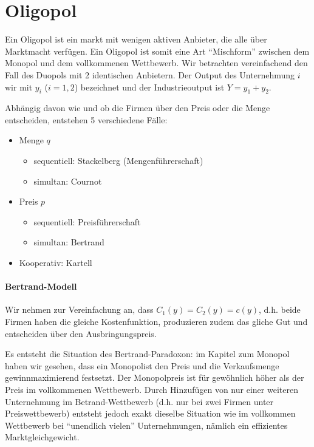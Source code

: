\chapter{Oligopol}

Ein Oligopol ist ein markt mit wenigen aktiven Anbieter, die alle über Marktmacht verfügen. Ein Oligopol ist somit eine Art \enquote{Mischform} zwischen dem Monopol und dem vollkommenen Wettbewerb. Wir betrachten vereinfachend den Fall des Duopols mit 2 identischen Anbietern. Der Output des Unternehmung $i$ wir mit $y_i$ ($i=1,2$) bezeichnet und der Industrieoutput ist $Y = y_1 + y_2$. ~\bigskip

Abhängig davon wie und ob die Firmen über den Preis oder die Menge entscheiden, entstehen 5 verschiedene Fälle:
\begin{itemize}
	\item Menge $q$
		\begin{itemize}
			\item sequentiell: Stackelberg (Mengenführerschaft)
			\item simultan: Cournot
		\end{itemize}
	\item Preis $p$
		\begin{itemize}
			\item sequentiell: Preisführerschaft
			\item simultan: Bertrand
		\end{itemize}		
	\item Kooperativ: Kartell
\end{itemize}

\subsubsection*{Bertrand-Modell}

Wir nehmen zur Vereinfachung an, dass $C_1(y) = C_2(y) = c(y)$, d.h. beide Firmen haben die gleiche Kostenfunktion, produzieren zudem das gliche Gut und entscheiden über den Ausbringungspreis. ~\smallskip

Es entsteht die Situation des Bertrand-Paradoxon: im Kapitel zum Monopol haben wir gesehen, dass ein Monopolist den Preis und die Verkaufsmenge gewinnmaximierend festsetzt. Der Monopolpreis ist für gewöhnlich höher als der Preis im vollkommenen Wettbewerb. Durch Hinzufügen von nur einer weiteren Unternehmung im Betrand-Wettbewerb (d.h. nur bei zwei Firmen unter Preiswettbewerb) entsteht jedoch exakt dieselbe Situation wie im vollkommen Wettbewerb bei \enquote{unendlich vielen} Unternehmungen, nämlich ein effizientes Marktgleichgewicht. ~\smallskip

